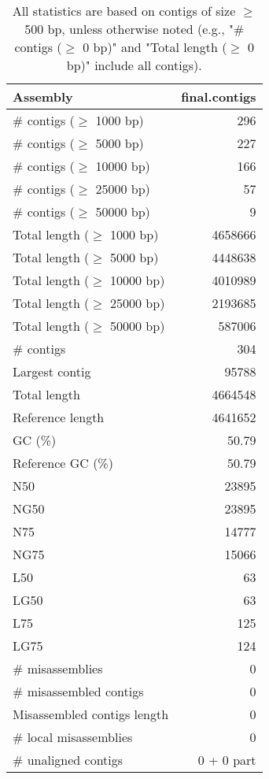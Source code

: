 \documentclass[12pt,a4paper]{article}
\begin{document}
\begin{table}[ht]
\begin{center}
\caption{All statistics are based on contigs of size $\geq$ 500 bp, unless otherwise noted (e.g., "\# contigs ($\geq$ 0 bp)" and "Total length ($\geq$ 0 bp)" include all contigs).}
\begin{tabular}{|l*{1}{|r}|}
\hline
Assembly & final.contigs \\ \hline
\# contigs ($\geq$ 1000 bp) & 296 \\ \hline
\# contigs ($\geq$ 5000 bp) & 227 \\ \hline
\# contigs ($\geq$ 10000 bp) & 166 \\ \hline
\# contigs ($\geq$ 25000 bp) & 57 \\ \hline
\# contigs ($\geq$ 50000 bp) & 9 \\ \hline
Total length ($\geq$ 1000 bp) & 4658666 \\ \hline
Total length ($\geq$ 5000 bp) & 4448638 \\ \hline
Total length ($\geq$ 10000 bp) & 4010989 \\ \hline
Total length ($\geq$ 25000 bp) & 2193685 \\ \hline
Total length ($\geq$ 50000 bp) & 587006 \\ \hline
\# contigs & 304 \\ \hline
Largest contig & 95788 \\ \hline
Total length & 4664548 \\ \hline
Reference length & 4641652 \\ \hline
GC (\%) & 50.79 \\ \hline
Reference GC (\%) & 50.79 \\ \hline
N50 & 23895 \\ \hline
NG50 & 23895 \\ \hline
N75 & 14777 \\ \hline
NG75 & 15066 \\ \hline
L50 & 63 \\ \hline
LG50 & 63 \\ \hline
L75 & 125 \\ \hline
LG75 & 124 \\ \hline
\# misassemblies & 0 \\ \hline
\# misassembled contigs & 0 \\ \hline
Misassembled contigs length & 0 \\ \hline
\# local misassemblies & 0 \\ \hline
\# unaligned contigs & 0 + 0 part \\ \hline

\end{tabular}
\end{center}
\end{table}
\end{document}
